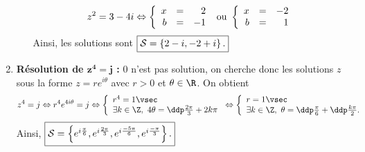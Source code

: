 \begin{correction}
\begin{enumerate}
\begin{itemize}
$$z^2=3-4i \Leftrightarrow \left\{\begin{array}{rcr} x&=&2\\b&=&-1\end{array}\right. \textmd{ ou } \left\{\begin{array}{rcr} x&=&-2\\b&=&1\end{array}\right. $$
Ainsi, les solutions sont $\fbox{$ \mathcal{S}=\left\lbrace  2-i, -2+i\right\rbrace .$}$
\end{itemize}
\item \textbf{R\'esolution de $\mathbf{z^4=j}$ :}
0 n'est pas solution, on cherche donc les solutions $z$ sous la forme $z=re^{i\theta}$ avec $r>0$ et $\theta\in\R$. On obtient
$$
z^4=j \Leftrightarrow  r^4e^{4i\theta}=j
\Leftrightarrow  \left\lbrace\begin{array}{l}
r^4=1\vsec\\
\exists k\in\Z,\ 4\theta=\ddp\frac{2\pi}{3}+2k\pi
\end{array}\right.
\Leftrightarrow  \left\lbrace\begin{array}{l}
r=1\vsec\\
\exists k\in\Z,\ \theta=\ddp\frac{\pi}{6}+\ddp\frac{k\pi}{2}.
\end{array}\right.
$$
Ainsi, $\fbox{$ \mathcal{S}=\left\lbrace  e^{i\frac{\pi}{6}},e^{i\frac{2\pi}{3}},e^{i\frac{-5\pi}{6}},e^{i\frac{-\pi}{3}}  \right\rbrace .$}$
\end{enumerate}
\end{correction}